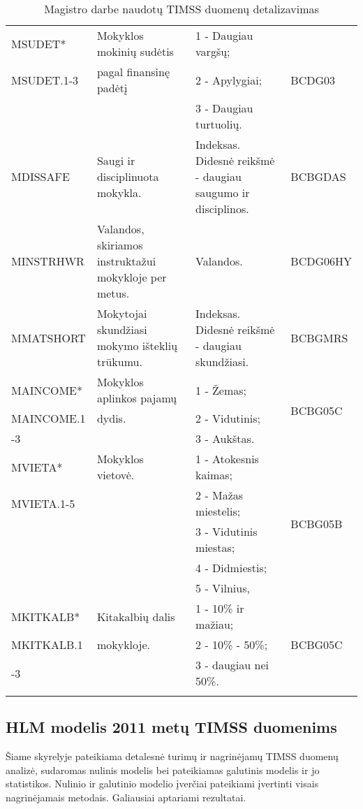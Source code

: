 \documentclass[11pt,a4paper]{article}
\begin{document}
\begin{small}
\begin{longtable}{| p{} | p{5cm} | p{5cm} | p{2.1 cm} |}
MSUDET* & Mokyklos mokinių sudėtis & 1 - Daugiau vargšų; & \multirow{3}{*}{BCDG03}\\
MSUDET.1-3 & pagal finansinę padėtį & 2 - Apylygiai; & \\
& & 3 - Daugiau turtuolių. & \\ \hline
MDISSAFE & Saugi ir disciplinuota mokykla. & Indeksas. Didesnė reikšmė - daugiau saugumo ir disciplinos. &BCBGDAS\\ \hline
MINSTRHWR & Valandos, skiriamos instruktažui mokykloje per metus. & Valandos. &BCDG06HY\\ \hline
MMATSHORT & Mokytojai skundžiasi mokymo išteklių trūkumu. & Indeksas. Didesnė reikšmė - daugiau skundžiasi. &BCBGMRS\\ \hline
MAINCOME* & Mokyklos aplinkos pajamų & 1 - Žemas; & \multirow{3}{*}{BCBG05C}\\
MAINCOME.1& dydis. & 2 - Vidutinis; & \\
-3& & 3 - Aukštas. & \\ \hline
MVIETA* & Mokyklos vietovė. & 1 - Atokesnis kaimas; & \multirow{5}{*}{BCBG05B}\\
MVIETA.1-5& & 2 - Mažas miestelis; & \\
& & 3 - Vidutinis miestas; & \\
& & 4 - Didmiestis; & \\
& & 5 - Vilnius, & \\ \hline
MKITKALB* & Kitakalbių dalis & 1 - 10\% ir mažiau; & \multirow{3}{*}{BCBG05C}\\
MKITKALB.1& mokykloje. & 2 - 10\% - 50\%; & \\
-3& & 3 - daugiau nei 50\%. & \\ \hline
\caption{Magistro darbe naudotų TIMSS duomenų detalizavimas}
\label{table:duom}
\end{longtable}
\end{small}


\subsection{HLM modelis 2011 metų TIMSS duomenims}

\indent Šiame skyrelyje pateikiama detalesnė turimų ir nagrinėjamų TIMSS duomenų analizė, sudaromas nulinis modelis bei pateikiamas galutinis modelis ir jo statistikos. Nulinio ir galutinio modelio įverčiai pateikiami įvertinti visais nagrinėjamais metodais. Galiausiai aptariami rezultatai.
\end{document}
